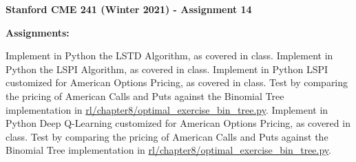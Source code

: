 \documentclass[12pt]{exam}
\begin{document}
\begin{center}
{\large {\bf Stanford CME 241 (Winter 2021) - Assignment 14}}
\end{center}
 
{\large{\bf Assignments:}}
\begin{questions}

\question Implement in Python the LSTD Algorithm, as covered in class.
\question Implement in Python the LSPI Algorithm, as covered in class.
\question Implement in Python LSPI customized for American Options Pricing, as covered in class. Test by comparing the pricing of American Calls and Puts against the Binomial Tree implementation in \href{https://github.com/TikhonJelvis/RL-book/blob/master/rl/chapter8/optimal_exercise_bin_tree.py}{rl\//chapter8\//optimal\_exercise\_bin\_tree.py}.
\question Implement in Python Deep Q-Learning customized for American Options Pricing, as covered in class. Test by comparing the pricing of American Calls and Puts against the Binomial Tree implementation in \href{https://github.com/TikhonJelvis/RL-book/blob/master/rl/chapter8/optimal_exercise_bin_tree.py}{rl\//chapter8\//optimal\_exercise\_bin\_tree.py}.

\end{questions}
\end{document}

